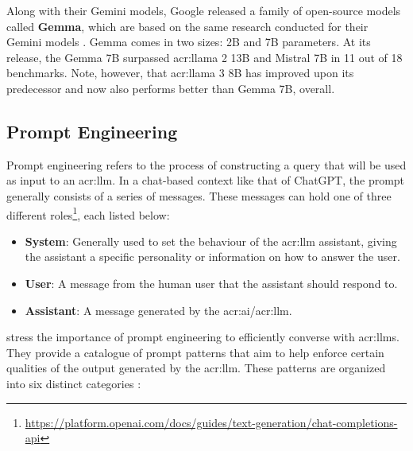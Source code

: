 Along with their Gemini models, Google released a family of open-source models called \textbf{Gemma}, which are based on the same research conducted for their Gemini models \citep{gemmateamGemmaOpenModels2024}. Gemma comes in two sizes: 2B and 7B parameters. At its release, the Gemma 7B surpassed \acrshort{acr:llama} 2 13B and Mistral 7B  in 11 out of 18 benchmarks. Note, however, that \acrshort{acr:llama} 3 8B has improved upon its predecessor and now also performs better than Gemma 7B, overall.


\subsection{Prompt Engineering}
\label{subsec:prompt-engineering}

Prompt engineering refers to the process of constructing a query that will be used as input to an \acrshort{acr:llm}. In a chat-based context like that of ChatGPT, the prompt generally consists of a series of messages. These messages can hold one of three different roles\footnote{\url{https://platform.openai.com/docs/guides/text-generation/chat-completions-api}}, each listed below:

\begin{itemize}
    \item \textbf{System}: Generally used to set the behaviour of the \acrshort{acr:llm} assistant, giving the assistant a specific personality or information on how to answer the user.
    \item \textbf{User}: A message from the human user that the assistant should respond to.
    \item \textbf{Assistant}: A message generated by the \acrshort{acr:ai}/\acrshort{acr:llm}.
\end{itemize}

\cite{whitePromptPatternCatalog2023a} stress the importance of prompt engineering to efficiently converse with \glspl{acr:llm}. They provide a catalogue of prompt patterns that aim to help enforce certain qualities of the output generated by the \gls{acr:llm}. These patterns are organized into six distinct categories \citep[4]{whitePromptPatternCatalog2023a}:

